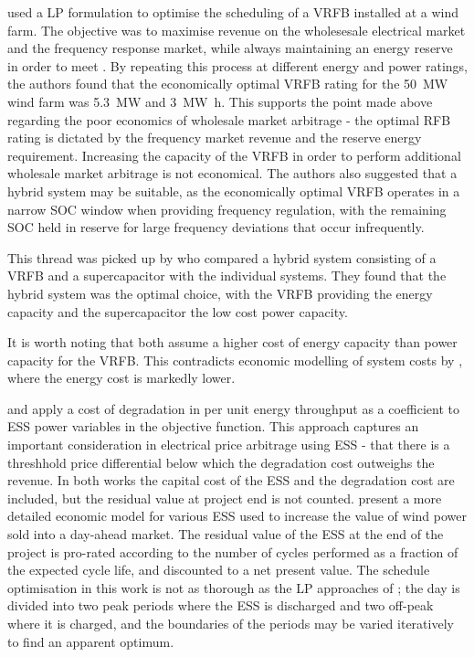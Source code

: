 \documentclass[preprint,3p,review,authoryear,10pt]{elsarticle}
\begin{document}
\cite{Johnston2015} used a LP formulation to optimise the scheduling of a VRFB installed at a wind farm. The objective was to maximise revenue on the wholesesale electrical market and the frequency response market, while always maintaining an energy reserve in order to meet . By repeating this process at different energy and power ratings, the authors found that the economically optimal VRFB rating for the \SI{50}{\mega\watt} wind farm was \SI{5.3}{\mega\watt} and \SI{3}{\mega\watt\hour}. This supports the point made above regarding the poor economics of wholesale market arbitrage - the optimal RFB rating is dictated by the frequency market revenue and the reserve energy requirement. Increasing the capacity of the VRFB in order to perform additional wholesale market arbitrage is not economical. The authors also suggested that a hybrid system may be suitable, as the economically optimal VRFB operates in a narrow SOC window when providing frequency regulation, with the remaining SOC held in reserve for large frequency deviations that occur infrequently.

This thread was picked up by \cite{Vaca2017} who compared a hybrid system consisting of a VRFB and a supercapacitor with the individual systems. They found that the hybrid system was the optimal choice, with the VRFB providing the energy capacity and the supercapacitor the low cost power capacity.

It is worth noting that both \cite{Johnston2015,Vaca2017} assume a higher cost of energy capacity than power capacity for the VRFB. This contradicts economic modelling of system costs by \cite{Viswanathan2014,Ha2015Estimatingstorage}, where the energy cost is markedly lower.

\cite{Johnston2015} and \cite{Vaca2017} apply a cost of degradation in \pound per unit energy throughput as a coefficient to ESS power variables in the objective function. This approach captures an important consideration in electrical price arbitrage using ESS - that there is a threshhold price differential below which the degradation cost outweighs the revenue. In both works the capital cost of the ESS and the degradation cost are included, but the residual value at project end is not counted. \cite{Dufo-Lopez2009} present a more detailed economic model for various ESS used to increase the value of wind power sold into a day-ahead market. The residual value of the ESS at the end of the project is pro-rated according to the number of cycles performed as a fraction of the expected cycle life, and discounted to a net present value. The schedule optimisation in this work is not as thorough as the LP approaches of  \cite{Johnston2015,Vaca2017}; the day is divided into two peak periods where the ESS is discharged and two off-peak where it is charged, and the boundaries of the periods may be varied iteratively to find an apparent optimum.
\end{document}
